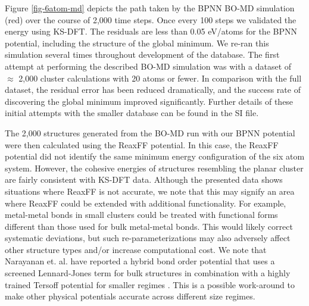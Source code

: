 \documentclass[12pt]{cmuthesis}
\begin{document}
Figure \ref{fig-6atom-md} depicts the path taken by the BPNN BO-MD simulation (red) over the course of 2,000 time steps. Once every 100 steps we validated the energy using KS-DFT. The residuals are less than 0.05 eV/atoms for the BPNN potential, including the structure of the global minimum. We re-ran this simulation several times throughout development of the database. The first attempt at performing the described BO-MD simulation was with a dataset of \(\approx\) 2,000 cluster calculations with 20 atoms or fewer. In comparison with the full dataset, the residual error has been reduced dramatically, and the success rate of discovering the global minimum improved significantly. Further details of these initial attempts with the smaller database can be found in the SI file.

The 2,000 structures generated from the BO-MD run with our BPNN potential were then calculated using the ReaxFF potential. In this case, the ReaxFF potential did not identify the same minimum energy configuration of the six atom system. However, the cohesive energies of structures resembling the planar cluster are fairly consistent with KS-DFT data. Although the presented data shows situations where ReaxFF is not accurate, we note that this may signify an area where ReaxFF could be extended with additional functionality. For example, metal-metal bonds in small clusters could be treated with functional forms different than those used for bulk metal-metal bonds. This would likely correct systematic deviations, but such re-parameterizations may also adversely affect other structure types and/or increase computational cost. We note that Narayanan et. al. have reported a hybrid bond order potential that uses a screened Lennard-Jones term for bulk structures in combination with a highly trained Tersoff potential for smaller regimes \cite{narayanan-2016-descr-diver}. This is a possible work-around to make other physical potentials accurate across different size regimes.
\end{document}
